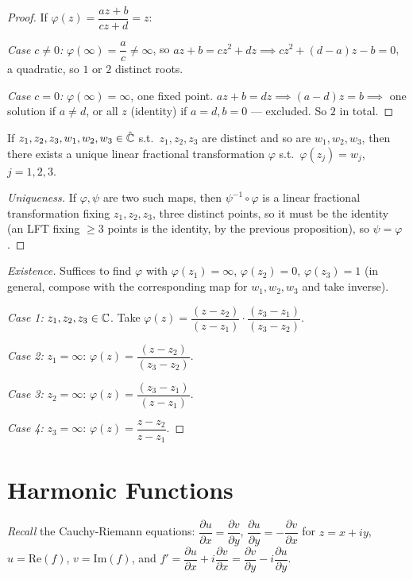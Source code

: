 \documentclass[11pt]{article}
\begin{document}
\begin{proof}
If $\varphi(z) = \dfrac{az+b}{cz+d} = z$:

\emph{Case $c\ne0$:} $\varphi(\infty)=\dfrac{a}{c}\ne\infty$, so $az+b=cz^2+dz \implies cz^2+(d-a)z-b=0$, a quadratic, so $1$ or $2$ distinct roots.

\emph{Case $c=0$:} $\varphi(\infty)=\infty$, one fixed point. $az+b=dz \implies (a-d)z=b \implies$ one solution if $a\ne d$, or all $z$ (identity) if $a=d,b=0$ --- excluded. So $2$ in total.
\end{proof}

\begin{theorem}
If $z_1,z_2,z_3,w_1,w_2,w_3\in\hat{{\mathbb{C}}}$ s.t.\ $z_1,z_2,z_3$ are distinct and so are $w_1,w_2,w_3$, then there exists a unique linear fractional transformation $\varphi$ s.t.\ $\varphi(z_j)=w_j$, $j=1,2,3$.
\end{theorem}

\begin{proof}[Uniqueness]
If $\varphi,\psi$ are two such maps, then $\psi^{-1}\circ\varphi$ is a linear fractional transformation fixing $z_1,z_2,z_3$, three distinct points, so it must be the identity (an LFT fixing $\ge3$ points is the identity, by the previous proposition), so $\psi=\varphi$.
\end{proof}

\begin{proof}[Existence]
Suffices to find $\varphi$ with $\varphi(z_1)=\infty$, $\varphi(z_2)=0$, $\varphi(z_3)=1$ (in general, compose with the corresponding map for $w_1,w_2,w_3$ and take inverse).

\emph{Case 1:} $z_1,z_2,z_3\in{\mathbb{C}}$. Take $\varphi(z) = \dfrac{(z-z_2)}{(z-z_1)}\cdot\dfrac{(z_3-z_1)}{(z_3-z_2)}$.

\emph{Case 2:} $z_1=\infty$: $\varphi(z) = \dfrac{(z-z_2)}{(z_3-z_2)}$.

\emph{Case 3:} $z_2=\infty$: $\varphi(z) = \dfrac{(z_3-z_1)}{(z-z_1)}$.

\emph{Case 4:} $z_3=\infty$: $\varphi(z) = \dfrac{z-z_2}{z-z_1}$.
\end{proof}

\newpage
\section{Harmonic Functions}

\emph{Recall} the Cauchy-Riemann equations: $\dfrac{\partial u}{\partial x} = \dfrac{\partial v}{\partial y}$, $\dfrac{\partial u}{\partial y} = -\dfrac{\partial v}{\partial x}$ for $z=x+iy$, $u=\mathrm{Re}(f)$, $v=\mathrm{Im}(f)$, and $f' = \dfrac{\partial u}{\partial x} + i\dfrac{\partial v}{\partial x} = \dfrac{\partial v}{\partial y} - i\dfrac{\partial u}{\partial y}$.
\end{document}
